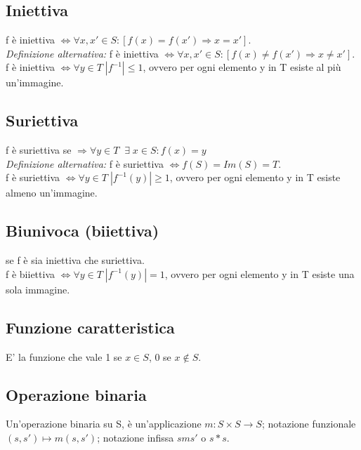 \subsection{Iniettiva} 
f è iniettiva \(\Leftrightarrow \forall x, x' \in S :[f(x)=f(x')\Rightarrow x=x']\).
\\\textit{Definizione alternativa:} f è iniettiva \(\Leftrightarrow \forall x,x' \in S : [f(x)\neq f(x') \Rightarrow x\neq x']\).
\\
f è iniettiva \(\Leftrightarrow \forall y \in T \; |f^{-1}|\leq 1\), ovvero per ogni elemento y in T esiste al più un'immagine.

\subsection{Suriettiva} 
f è suriettiva se \(\Rightarrow \forall y\in T \;\;\exists\; x \in S : f(x)=y\)
\\
\textit{Definizione alternativa:} f è suriettiva \(\Leftrightarrow f(S) = Im(S) = T\).
\\
f è suriettiva \(\Leftrightarrow \forall y \in T \; |f^{-1}(y)|\geq 1\), ovvero per ogni elemento y in T esiste almeno un'immagine.

\subsection{Biunivoca (biiettiva)} se f è sia iniettiva che suriettiva.
\\
f è biiettiva \(\Leftrightarrow \forall y \in T \; |f^{-1}(y)|=1\), ovvero per ogni elemento y in T esiste una sola immagine.

\subsection{Funzione caratteristica} 
E' la funzione che vale 1 se \(x \in S\), 0 se \(x \notin S\).

\subsection{Operazione binaria} 
Un'operazione binaria su S, è un'applicazione \(m:S\times S \rightarrow S\); notazione funzionale \((s, s') \mapsto m(s, s')\); notazione infissa \(sms'\) o \(s*s\).

